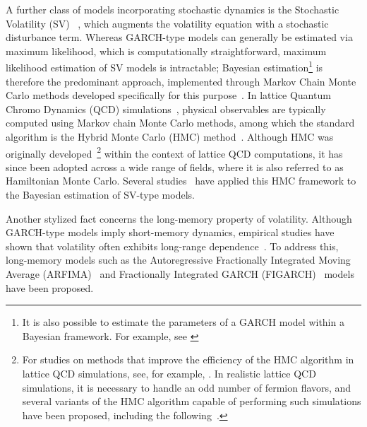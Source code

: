 \documentclass[preprints,article,accept,pdftex,oneauthor]{Definitions/mdpi}
\begin{document}
A further class of models incorporating stochastic dynamics is the
Stochastic Volatility (SV) ~\cite{taylor1982,taylor1986modelling}, which augments the volatility
equation with a stochastic disturbance term. Whereas GARCH-type models
can generally be estimated via maximum likelihood, which is
computationally straightforward, maximum likelihood estimation of SV
models is intractable; Bayesian estimation\footnote{It is also possible to estimate the parameters of a GARCH model within a Bayesian framework. For example, see \cite{Takaishi2006/10,Takaishi2009,Takaishi2009Complex,Takaishi2009IEEE,takaishi2010bayesian,takaishi2013markov}} is therefore the predominant
approach, implemented through Markov Chain Monte Carlo methods developed
specifically for this purpose~\cite{kim1998stochastic,jacquier2002bayesian, omori2007stochastic,omori2008block}.
In lattice Quantum Chromo Dynamics (QCD) simulations~\cite{wilson1974confinement,creutz1980monte,gupta1998introduction,ukawa1989lattice,lippert2007hybrid}, physical observables are typically computed using Markov chain Monte Carlo methods, among which the standard algorithm is the Hybrid Monte Carlo (HMC) method~\cite{duane1987hybrid}. Although HMC was originally developed~\footnote{For studies on methods that improve the efficiency of the HMC algorithm in lattice QCD simulations, see, for example, \cite{sexton1992hamiltonian,hasenbusch2001speeding,Takaishi1997Fast, takaishi2000choice,takaishi2002higher,takaishi2006testing}. In realistic lattice QCD simulations, it is necessary to handle an odd number of fermion flavors, and several variants of the HMC algorithm capable of performing such simulations have been proposed, including the following~\cite{takaishi2002odd,clark2006rational,clark2007accelerating}.} within the context of lattice QCD computations, it has since been adopted across a wide range of fields, where it is also referred to as Hamiltonian Monte Carlo. Several studies~\cite{takaishi2008financial, takaishi2009bayesian,takaishi2014RSV,takaishi2015GPU,takaishi2015application} have applied this HMC framework to the Bayesian estimation of SV-type models.


Another stylized fact concerns the long-memory property of volatility. Although GARCH-type models imply short-memory dynamics, empirical studies have shown that volatility often exhibits long-range dependence~\cite{ding1993long,andersen2003modeling}. To address this, long-memory models such as the Autoregressive Fractionally Integrated Moving Average (ARFIMA)~\cite{granger1980introduction} and Fractionally Integrated GARCH (FIGARCH)~\cite{baillie1996fractionally,tayefi2012overview} models have been proposed.
\end{document}
